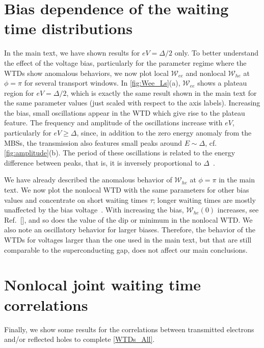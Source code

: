 \documentclass[aps,prl,amsmath,twocolumn,floatfix,superscriptaddress,longbibliography,footinbib]{revtex4-1}
\begin{document}
\section{\label{sec:bias}Bias dependence of the waiting time distributions}
In the main text, we have shown results for $eV=\Delta/2$ only. To better understand the effect of the voltage bias, particularly for the parameter regime where the WTDs show anomalous behaviors, we now plot local $\mathcal{W}_{ee}$ and nonlocal $\mathcal{W}_{he}$ at $\phi\!=\!\pi$ for several transport windows. 
In \cref{fig:Wee_Ls}(a), $\mathcal{W}_{ee}$ shows a plateau region for $eV=\Delta/2$, which is exactly the same result shown in the main text for the same parameter values (just scaled with respect to the axis labels). 
Increasing the bias, small oscillations appear in the WTD which give rise to the plateau feature. The frequency and amplitude of the oscillations increase with $eV$, particularly for $eV\!\ge\!\Delta$, since, in addition to the zero energy anomaly from the MBSs, the transmission also features small peaks around $E\sim\Delta$, cf. \cref{fig:amplitude}(b). The period of these oscillations is related to the energy difference between peaks, that is, it is inversely proportional to $\Delta$~\cite{Haack2014,Mi2018,Schulz2022}. 

We have already described the anomalous behavior of $\mathcal{W}_{he}$ at $\phi=\pi$ in the main text. We now plot the nonlocal WTD with the same parameters for other bias values and concentrate on short waiting times $\tau$; longer waiting times are mostly unaffected by the bias voltage~\cite{Mi2018}. 
With increasing the bias, $\mathcal{W}_{he}(0)$ increases, see Ref.~[], and so does the value of the dip or minimum in the nonlocal WTD. We also note an oscillatory behavior for larger biases. Therefore, the behavior of the WTDs for voltages larger than the one used in the main text, but that are still comparable to the superconducting gap, does not affect our main conclusions. 

\section{Nonlocal joint waiting time correlations\label{sec:joint-wtd}}
Finally, we show some results for the correlations between transmitted electrons and/or reflected holes to complete \cref{WTDs_All}. 
\end{document}
